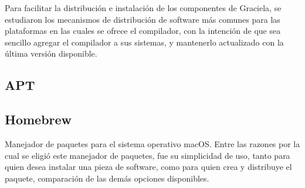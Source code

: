Para facilitar la distribución e instalación de los componentes de Graciela, se
estudiaron los mecanismos de distribución de software más comunes para las
plataformas en las cuales se ofrece el compilador, con la intención de que sea
sencillo agregar el compilador a sus sistemas, y mantenerlo actualizado con la
última versión disponible.

\subsection{APT}

\subsection{Homebrew}

Manejador de paquetes para el sistema operativo macOS. Entre las razones por
la cual se eligió este manejador de paquetes, fue su simplicidad de uso, tanto
para quien desea instalar una pieza de software, como para quien crea y
distribuye el paquete, comparación de las demás opciones disponibles.
